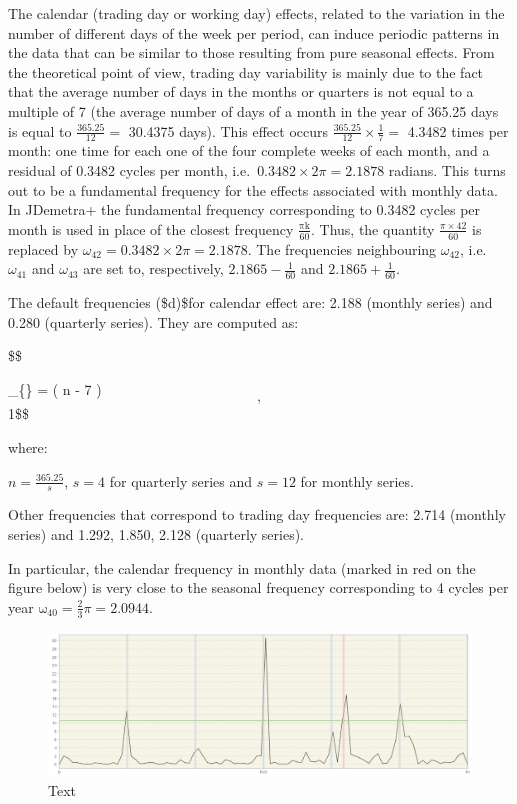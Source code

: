 \documentclass[
  letterpaper,
  DIV=11,
  numbers=noendperiod]{scrreprt}
\begin{document}
The calendar (trading day or working day) effects, related to the
variation in the number of different days of the week per period, can
induce periodic patterns in the data that can be similar to those
resulting from pure seasonal effects. From the theoretical point of
view, trading day variability is mainly due to the fact that the average
number of days in the months or quarters is not equal to a multiple of 7
(the average number of days of a month in the year of 365.25 days is
equal to \(\frac{365.25}{12} =\) 30.4375 days). This effect occurs
\(\frac{365.25}{12} \times \frac{1}{7} =\) 4.3482 times per month: one
time for each one of the four complete weeks of each month, and a
residual of 0.3482 cycles per month,
i.e.~\(0.3482 \times 2\pi = 2.1878\) radians. This turns out to be a
fundamental frequency for the effects associated with monthly data. In
JDemetra+ the fundamental frequency corresponding to 0.3482 cycles per
month is used in place of the closest frequency
\(\frac{\text{πk}}{60}\). Thus, the quantity
\(\frac{\pi \times 42}{60}\) is replaced by
\(\omega_{42} = 0.3482 \times 2\pi = 2.1878\). The frequencies
neighbouring \(\omega_{42}\), i.e.~\(\omega_{41}\) and \(\omega_{43}\)
are set to, respectively, \(2.1865 - \frac{1}{60}\) and
\(2.1865 + \frac{1}{60}\).

The default frequencies (\$d)\$for calendar effect are: 2.188 (monthly
series) and 0.280 (quarterly series). They are computed as:

\$\$

\omega\_\{\} = \left( n - 7
\times \left\lbrack {} \right\rbrack \right) \[, \]1\$\$

where:

\(n = \frac{365.25}{s}\), \(s = 4\) for quarterly series and \(s = 12\)
for monthly series.

Other frequencies that correspond to trading day frequencies are: 2.714
(monthly series) and 1.292, 1.850, 2.128 (quarterly series).

In particular, the calendar frequency in monthly data (marked in red on
the figure below) is very close to the seasonal frequency corresponding
to 4 cycles per year \(\text{ω}_{40} = \frac{2}{3}\pi = 2.0944\).

\begin{figure}

{\centering \includegraphics{./All_images/UG_A_image19.png}

}

\caption{Text}

\end{figure}
\end{document}
